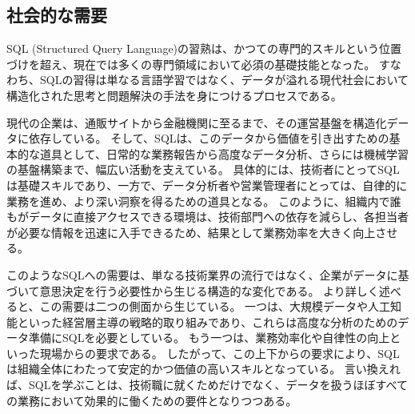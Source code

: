 \documentclass[uplatex,a4paper,12pt]{ujreport}
\begin{document}
\subsection{社会的な需要}
SQL (Structured Query Language)の習熟は、かつての専門的スキルという位置づけを超え、現在では多くの専門領域において必須の基礎技能となった。
すなわち、SQLの習得は単なる言語学習ではなく、データが溢れる現代社会において構造化された思考と問題解決の手法を身につけるプロセスである。
\par
現代の企業は、通販サイトから金融機関に至るまで、その運営基盤を構造化データに依存している。
そして、SQLは、このデータから価値を引き出すための基本的な道具として、日常的な業務報告から高度なデータ分析、さらには機械学習の基盤構築まで、幅広い活動を支えている。
具体的には、技術者にとってSQLは基礎スキルであり、一方で、データ分析者や営業管理者にとっては、自律的に業務を進め、より深い洞察を得るための道具となる。
このように、組織内で誰もがデータに直接アクセスできる環境は、技術部門への依存を減らし、各担当者が必要な情報を迅速に入手できるため、結果として業務効率を大きく向上させる。
\par
このようなSQLへの需要は、単なる技術業界の流行ではなく、企業がデータに基づいて意思決定を行う必要性から生じる構造的な変化である。
より詳しく述べると、この需要は二つの側面から生じている。
一つは、大規模データや人工知能といった経営層主導の戦略的取り組みであり、これらは高度な分析のためのデータ準備にSQLを必要としている。
もう一つは、業務効率化や自律性の向上といった現場からの要求である。
したがって、この上下からの要求により、SQLは組織全体にわたって安定的かつ価値の高いスキルとなっている。
言い換えれば、SQLを学ぶことは、技術職に就くためだけでなく、データを扱うほぼすべての業務において効果的に働くための要件となりつつある。
\end{document}
